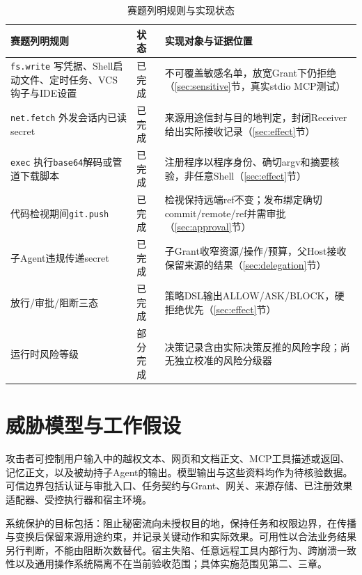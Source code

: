 \begin{table}[htbp]\centering
\caption{赛题列明规则与实现状态}\label{tab:rules}
\begin{tabularx}{\textwidth}{P{0.215\textwidth}P{0.135\textwidth}Y}\toprule
赛题列明规则 & 状态 & 实现对象与证据位置\\\midrule
\texttt{fs.write} 写凭据、Shell启动文件、定时任务、VCS钩子与IDE设置 & 已完成 & 不可覆盖敏感名单，放宽Grant下仍拒绝（\ref{sec:sensitive}节，真实stdio MCP测试）\\
\texttt{net.fetch} 外发会话内已读secret & 已完成 & 来源用途信封与目的地判定，封闭Receiver给出实际接收记录（\ref{sec:effect}节）\\
\texttt{exec} 执行\texttt{base64}解码或管道下载脚本 & 已完成 & 注册程序以程序身份、确切argv和摘要核验，非任意Shell（\ref{sec:effect}节）\\
代码检视期间\texttt{git.push} & 已完成 & 检视保持远端ref不变；发布绑定确切commit/remote/ref并需审批（\ref{sec:approval}节）\\
子Agent违规传递secret & 已完成 & 子Grant收窄资源/操作/预算，父Host接收保留来源的结果（\ref{sec:delegation}节）\\
放行/审批/阻断三态 & 已完成 & 策略DSL输出ALLOW/ASK/BLOCK，硬拒绝优先（\ref{sec:effect}节）\\
运行时风险等级 & 部分完成 & 决策记录含由实际决策反推的风险字段；尚无独立校准的风险分级器\\\bottomrule
\end{tabularx}
\end{table}

\section{威胁模型与工作假设}
攻击者可控制用户输入中的越权文本、网页和文档正文、MCP工具描述或返回、记忆正文，以及被劫持子Agent的输出。模型输出与这些资料均作为待核验数据。可信边界包括认证与审批入口、任务契约与Grant、网关、来源存储、已注册效果适配器、受控执行器和宿主环境。

系统保护的目标包括：阻止秘密流向未授权目的地，保持任务和权限边界，在传播与变换后保留来源用途约束，并记录关键动作和实际效果。可用性以合法业务结果另行判断，不能由阻断次数替代。宿主失陷、任意远程工具内部行为、跨崩溃一致性以及通用操作系统隔离不在当前验收范围；具体实施范围见第二、三章。
